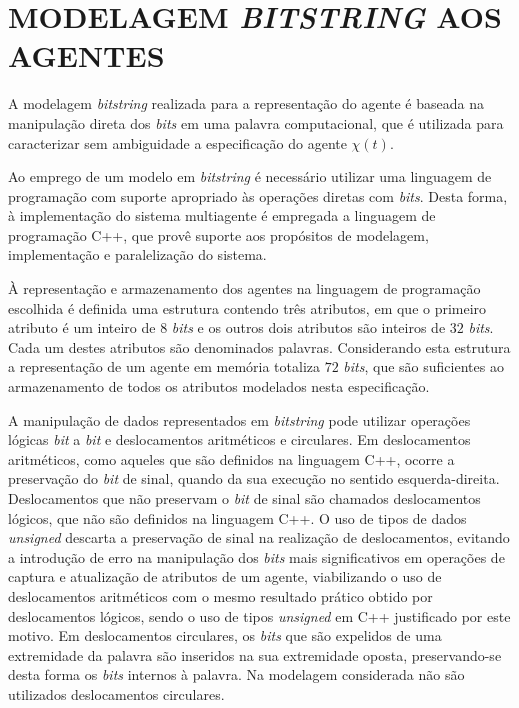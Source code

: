 \section{MODELAGEM \textit{BITSTRING} AOS AGENTES}
\label{sec:modelagemBitstring}

A modelagem \textit{bitstring} realizada para a representação do agente é baseada na manipulação direta dos \textit{bits} em uma palavra computacional, que é utilizada para caracterizar sem ambiguidade a especificação do agente $\chi(t)$.

Ao emprego de um modelo em \textit{bitstring} é necessário utilizar uma linguagem de programação com suporte apropriado às operações diretas com \textit{bits}. Desta forma, à implementação do sistema multiagente é empregada a linguagem de programação C++, que provê suporte aos propósitos de modelagem, implementação e paralelização do sistema. 

À representação e armazenamento dos agentes na linguagem de programação escolhida é definida uma estrutura contendo três atributos, em que o primeiro atributo é um inteiro de $8$ \textit{bits} e os outros dois atributos são inteiros de $32$ \textit{bits}. Cada um destes atributos são denominados palavras. Considerando esta estrutura a representação de um agente em memória totaliza $72$ \textit{bits}, que são suficientes ao armazenamento de todos os atributos modelados nesta especificação. 

A manipulação de dados representados em \textit{bitstring} pode utilizar operações lógicas \textit{bit} a \textit{bit} e deslocamentos aritméticos e circulares. Em deslocamentos aritméticos, como aqueles que são definidos na linguagem C++, ocorre a preservação do \textit{bit} de sinal, quando da sua execução no sentido esquerda-direita. Deslocamentos que não preservam o \textit{bit} de sinal são chamados deslocamentos lógicos, que não são definidos na linguagem C++. O uso de tipos de dados \textit{unsigned} descarta a preservação de sinal na realização de deslocamentos, evitando a introdução de erro na manipulação dos \textit{bits} mais significativos em operações de captura e atualização de atributos de um agente, viabilizando o uso de deslocamentos aritméticos com o mesmo resultado prático obtido por deslocamentos lógicos, sendo o uso de tipos \textit{unsigned} em C++ justificado por este motivo. Em deslocamentos circulares, os \textit{bits} que são expelidos de uma extremidade da palavra são inseridos na sua extremidade oposta, preservando-se desta forma os \textit{bits} internos à palavra. Na modelagem considerada não são utilizados deslocamentos circulares. 

